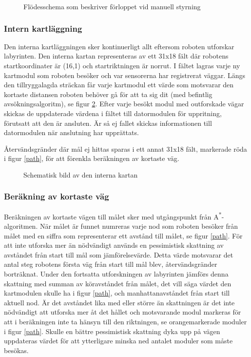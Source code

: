 \documentclass[11pt]{article}
\begin{document}
\begin{flushleft}
\begin{figure}[htbp]
\centering
\noindent\resizebox{0.9\linewidth}{!}{
	}
	\cprotect\caption{Flödesschema som beskriver förloppet vid manuell styrning \label{manualMode}}	
\end{figure}

\subsubsection{Intern kartläggning} \label{search}
Den interna kartläggningen sker kontinuerligt allt eftersom roboten utforskar labyrinten. Den interna kartan representeras av ett 31x18 fält där robotens startkoordinater är (16,1) och startriktningen är norrut. I fältet lagras varje ny kartmodul som roboten besöker och var sensorerna har registrerat väggar. Längs den tillryggalagda sträckan får varje kartmodul ett värde som motsvarar den kortaste distansen roboten behöver gå för att ta sig dit (med befintlig avsökningsalgoritm), se figur \ref{map}. Efter varje besökt modul med outforskade vägar skickas de uppdaterade värdena i fältet till datormodulen för uppritning, förutsatt att den är ansluten. Är så ej fallet skickas informationen till datormodulen när anslutning har upprättats. 

Återvändsgränder där mål ej hittas sparas i ett annat 31x18 fält, markerade röda i figur \ref{path}, för att förenkla beräkningen av kortaste väg. 

\begin{figure}[htbp]
\centering
\noindent\resizebox{0.7\linewidth}{!}{
	}
	\caption{Schematisk bild av den interna kartan}	\label{map}
\end{figure}

\subsubsection{Beräkning av kortaste väg} \label{shortestPath}
Beräkningen av kortaste vägen till målet sker med utgångspunkt från A\textsuperscript{*}-algoritmen. När målet är funnet numreras varje nod som roboten besöker från målet med en siffra som representerar ett avstånd till målet, se figur \ref{path}. För att inte utforska mer än nödvändigt används en pessimistisk skattning av avståndet från start till mål som jämförelsevärde. Detta värde motsvarar det antal steg robotens första väg från start till mål blev, återvändsgränder borträknat. Under den fortsatta utforskningen av labyrinten jämförs denna skattning med summan av köravståndet från målet, det vill säga värdet den kartmodulen skulle ha i figur \ref{path}, och manhattanavståndet från start till aktuell nod. Är det avståndet lika med eller större än skattningen är det inte nödvändigt att utforska mer åt det hållet och motsvarande modul markeras för att i beräkningen inte ta hänsyn till den riktningen, se orangemarkerade moduler i figur \ref{path}. Skulle en bättre pessimistisk skattning dyka upp på vägen uppdateras värdet för att ytterligare minska ned antalet moduler som måste besökas.


\end{flushleft}
\end{document}
